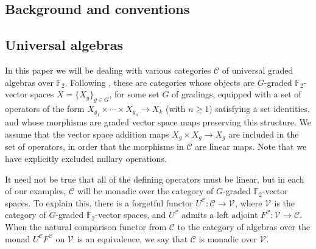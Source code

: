 \documentclass[11pt]{amsart} \renewcommand{\baselinestretch}{1.2}
\theoremstyle{plain}
\theoremstyle{definition}
\renewcommand{\to}{\longrightarrow}
\newcommand{\calV}{\mathcal{V}}
\newcommand{\calc}{\mathcal{C}}
\newcommand{\citeBOX}[2][]{\cite[\mbox{#1}]{#2}}
\newcommand{\vect}[2]{\calV^{#1}_{#2}}
\newcommand{\F}{\mathbb{F}}
\newcommand{\Ftwo}{\F_2}
\begin{document}
\begin{Conventions and notation}
\section{\textbf{Background and conventions}}
\label{Conventions and notation}

\subsection{Universal algebras}
\label{Universal algebras}
In this paper we will be dealing with various categories $\calc$ of universal graded algebras over $\Ftwo $. Following \citeBOX[\S2.1]{Blanc_Stover-Groth_SS.pdf}, these are categories whose objects are $G$-graded $\Ftwo $-vector spaces $X=\{X_g\}_{g\in G}$, for some set $G$ of gradings, equipped with a set of operators of the form $X_{g_1}\times \cdots \times X_{g_n}\to X_k$ (with $n\geq1$)  satisfying a set identities, and whose morphisms are graded vector space maps preserving this structure. We assume that the vector space addition  maps $X_g\times X_g\to X_{g}$ are included in the set of operators, in order that the morphisms in $\calc$ are linear maps. Note that we have explicitly excluded nullary operations. 

It need not  be true that all of the defining operators must be linear, but in each of our examples, $\calc$ will be monadic over the category of $G$-graded $\Ftwo $-vector spaces. To explain this, there is a forgetful functor $U^\calc:\calc\to\vect{}{}$, where $\vect{}{}$ is the category of $G$-graded $\Ftwo $-vector spaces, and $U^{\calc}$ admits a left adjoint  $F^\calc:\vect{}{}\to\calc$. %
When the natural comparison functor from $\calc$ to the category of algebras over the monad $U^{\calc}F^{\calc}$ on $\vect{}{}$ is an equivalence, we say that $\calc$ is monadic over $\vect{}{}$.


\end{Conventions and notation}
\end{document}
